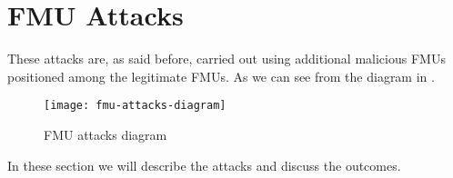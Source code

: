 \section{FMU Attacks}

These attacks are, as said before, carried out using additional malicious FMUs
positioned among the legitimate FMUs. As we can see from the diagram in
.

\begin{figure}[htb]
	\centering
	\texttt{[image: fmu-attacks-diagram]}
	\caption{FMU attacks diagram}\label{fig:fmuatksdiagram}
\end{figure}

In these section we will describe the attacks and discuss the outcomes.




